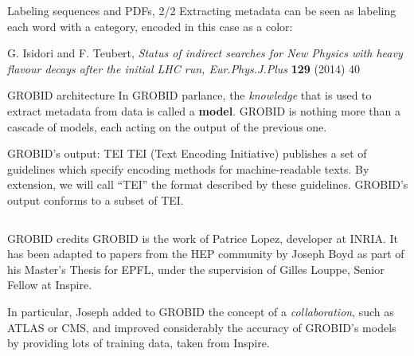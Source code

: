 \documentclass[10pt]{beamer}
\begin{document}
  \begin{frame}{Labeling sequences and PDFs, 2/2}
    Extracting metadata can be seen as labeling each word with a category,
    encoded in this case as a color:

    \vspace{0.5cm}

    \begin{framed}
      \color{blue}G. Isidori and F. Teubert, \color{red}\textit{Status of indirect searches for New Physics with heavy flavour decays after the initial LHC run, \color{green}Eur.Phys.J.Plus} \color{green}\textbf{129} (2014) 40\color{black}
    \end{framed}
  \end{frame}

  \begin{frame}{GROBID architecture}
    In GROBID parlance, the \emph{knowledge} that is used to extract metadata
    from data is called a \textbf{model}. GROBID is nothing more than a
    cascade of models, each acting on the output of the previous one.

    \vspace{0.5cm}

  \end{frame}

  \begin{frame}{GROBID's output: TEI}
    TEI (Text Encoding Initiative) publishes a set of guidelines which specify
    encoding methods for machine-readable texts. By extension, we will call
    ``TEI'' the format described by these guidelines. GROBID's output conforms
    to a subset of TEI.

    \vspace{0.5cm}

    \inputminted[fontsize=\tiny]{xml}{tex/src/reference.xml}
  \end{frame}

  \begin{frame}{GROBID credits}
    GROBID is the work of Patrice Lopez, developer at INRIA. It has been adapted
    to papers from the HEP community by Joseph Boyd as part of his Master's Thesis
    for EPFL, under the supervision of Gilles Louppe, Senior Fellow at Inspire.

    \vspace{0.5cm}

    In particular, Joseph added to GROBID the concept of a \emph{collaboration},
    such as ATLAS or CMS, and improved considerably the accuracy of GROBID's
    models by providing lots of training data, taken from Inspire.
  \end{frame}
\end{document}
